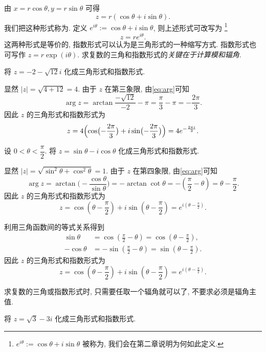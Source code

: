 由 $x=r\cos\theta,y=r\sin\theta$ 可得
  \[z=r(\cos\theta+i\sin\theta).\]
我们把这种形式称为.
定义 \emph{$e^{i\theta}:=\cos\theta+i\sin\theta$}, 则上述形式可改写为%
  \footnote{%
    $e^{i\theta}:=\cos\theta+i\sin\theta$ 被称为, 我们会在第二章说明为何如此定义.
  }%
  \[z=re^{i\theta}.\]
这两种形式是等价的, 指数形式可以认为是三角形式的一种缩写方式.
指数形式也可写作 $z=r\exp(i\theta)$.
求复数的三角和指数形式的\emph{关键在于计算模和辐角}.

\begin{example}
  将 $z=-2-\sqrt{12}i$ 化成三角形式和指数形式.
\end{example}

\begin{solution}
  显然 $|z|=\sqrt{4+12}=4$.
  由于 $z$ 在第三象限, 由\eqref{eq:arg}可知
    \[\arg z=\arctan\frac{-\sqrt{12}}{-2}-\pi=\frac\pi3-\pi=-\frac{2\pi}3.\]
  因此 $z$ 的三角形式和指数形式为
    \[z=4\Bigl(\cos\bigl(-\frac{2\pi}3\bigr)+i\sin\bigl(-
    \frac{2\pi}3\bigr)\Bigr)=4e^{-\frac{2\pi i}3}.\]
\end{solution}

\begin{example}
  设 $0<\theta<\dfrac\pi2$. 将 $z=\sin\theta-i\cos\theta$ 化成三角形式和指数形式.
\end{example}
\begin{solution}
  显然 $|z|=\sqrt{\sin^2\theta+\cos^2\theta}=1$. 由于 $z$ 在第四象限, 由\eqref{eq:arg}可知
  \[\arg z=\arctan\bigl(-\frac{\cos\theta}{\sin\theta}\bigr)=-\arctan\cot\theta=-(\frac\pi2-\theta)=\theta-\frac\pi2.\]
  因此 $z$ 的三角形式和指数形式为
  \[z=\displaystyle\cos(\theta-\frac\pi2)+i\sin(\theta-\frac\pi2)=e^{i(\theta-\frac\pi2)}.\]
\end{solution}
\begin{solution}[另解]
  利用三角函数间的等式关系得到
  \begin{align*}
    \sin\theta&=\cos(\frac\pi2-\theta)=\cos(\theta-\frac\pi2),\\
    -\cos\theta&=-\sin(\frac\pi2-\theta)=\sin(\theta-\frac\pi2).
  \end{align*}
  因此 $z$ 的三角形式和指数形式为
  \[z=\displaystyle\cos(\theta-\frac\pi2)+i\sin(\theta-\frac\pi2)=e^{i(\theta-\frac\pi2)}.\]
\end{solution}

求复数的三角或指数形式时, 只需要任取一个辐角就可以了, 不要求必须是辐角主值.

\begin{exercise}
  将 $z=\sqrt 3-3i$ 化成三角形式和指数形式.
\end{exercise}

